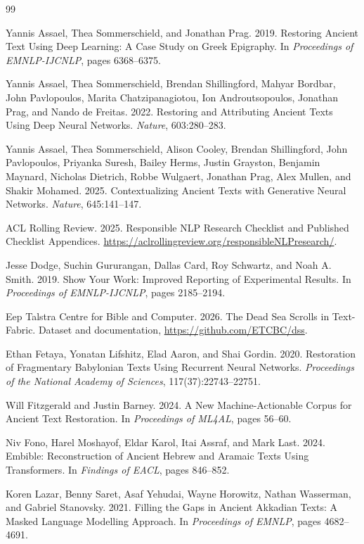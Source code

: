 \documentclass[10pt,twocolumn,a4paper]{article}
\begin{document}
\begingroup
\small
\begin{thebibliography}{99}

Yannis Assael, Thea Sommerschield, and Jonathan Prag. 2019.
Restoring Ancient Text Using Deep Learning: A Case Study on Greek Epigraphy.
In \textit{Proceedings of EMNLP-IJCNLP}, pages 6368--6375.

Yannis Assael, Thea Sommerschield, Brendan Shillingford, Mahyar Bordbar,
John Pavlopoulos, Marita Chatzipanagiotou, Ion Androutsopoulos,
Jonathan Prag, and Nando de Freitas. 2022.
Restoring and Attributing Ancient Texts Using Deep Neural Networks.
\textit{Nature}, 603:280--283.

Yannis Assael, Thea Sommerschield, Alison Cooley, Brendan Shillingford,
John Pavlopoulos, Priyanka Suresh, Bailey Herms, Justin Grayston,
Benjamin Maynard, Nicholas Dietrich, Robbe Wulgaert, Jonathan Prag,
Alex Mullen, and Shakir Mohamed. 2025.
Contextualizing Ancient Texts with Generative Neural Networks.
\textit{Nature}, 645:141--147.

ACL Rolling Review. 2025.
Responsible NLP Research Checklist and Published Checklist Appendices.
\url{https://aclrollingreview.org/responsibleNLPresearch/}.

Jesse Dodge, Suchin Gururangan, Dallas Card, Roy Schwartz, and Noah A. Smith. 2019.
Show Your Work: Improved Reporting of Experimental Results.
In \textit{Proceedings of EMNLP-IJCNLP}, pages 2185--2194.

Eep Talstra Centre for Bible and Computer. 2026.
The Dead Sea Scrolls in Text-Fabric.
Dataset and documentation, \url{https://github.com/ETCBC/dss}.

Ethan Fetaya, Yonatan Lifshitz, Elad Aaron, and Shai Gordin. 2020.
Restoration of Fragmentary Babylonian Texts Using Recurrent Neural Networks.
\textit{Proceedings of the National Academy of Sciences}, 117(37):22743--22751.

Will Fitzgerald and Justin Barney. 2024.
A New Machine-Actionable Corpus for Ancient Text Restoration.
In \textit{Proceedings of ML4AL}, pages 56--60.

Niv Fono, Harel Moshayof, Eldar Karol, Itai Assraf, and Mark Last. 2024.
Embible: Reconstruction of Ancient Hebrew and Aramaic Texts Using Transformers.
In \textit{Findings of EACL}, pages 846--852.

Koren Lazar, Benny Saret, Asaf Yehudai, Wayne Horowitz, Nathan Wasserman,
and Gabriel Stanovsky. 2021.
Filling the Gaps in Ancient Akkadian Texts: A Masked Language Modelling Approach.
In \textit{Proceedings of EMNLP}, pages 4682--4691.


\end{thebibliography}
\end{document}
